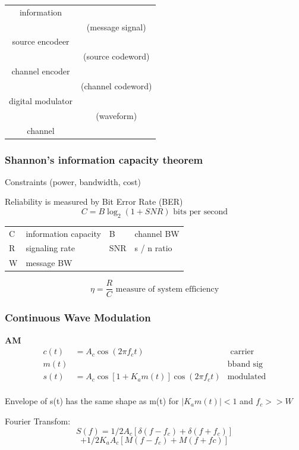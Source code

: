 \documentclass[a4paper,12pt]{article}
\begin{document}
\begin{multicols}{2}
\begin{tabular}{cc}
information&\\
&(message signal)\\
source encodeer&\\
&(source codeword)\\
channel encoder&\\
&(channel codeword)\\
digital modulator&\\
&(waveform)\\
channel&\\
\end{tabular}

\subsubsection*{Shannon's information capacity theorem}

Constraints (power, bandwidth, cost)

Reliability is measured by Bit Error Rate (BER)
\[
C = B \log_2 (1+SNR) \mbox{ \ \ bits per second}
\]
\begin{tabular}{llll}
C&information capacity&B& channel BW\\
R& signaling rate&SNR& s / n ratio\\
W& message BW\\
\end{tabular}
\[
\eta = \frac{R}{C} \mbox{ \ \ measure of system efficiency}
\]

\subsubsection*{Continuous Wave Modulation}
\textbf{AM}
\begin{align*}
c(t) &=A_c \cos (2\pi f_ct)& \mbox{ carrier}\\
m(t) &  &\mbox{bband sig}\\
s(t) &=A_c \cos \left[1+K_am(t)\right] \cos(2\pi f_ct) &\mbox{modulated}\\
\end{align*}

Envelope of s(t) has the same shape as m(t) for $|K_a m(t)| < 1$ and $f_c >> W$

Fourier Transfom:
\[S(f) = 1/2 A_c [\delta(f-f_c)+\delta(f+f_c)]\]
\[+ 1/2K_aA_c[M(f-f_c)+M(f+fc)]\]



\end{multicols}
\end{document}
